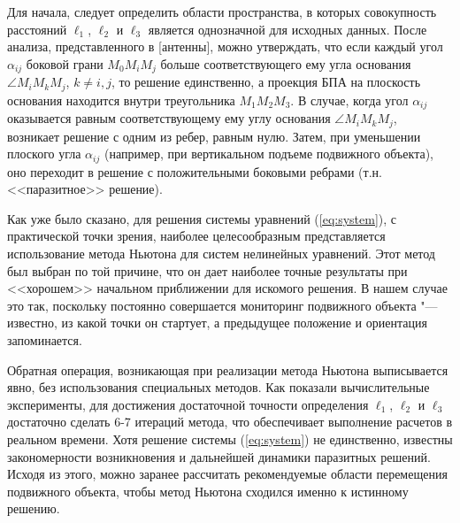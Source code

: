 \documentclass[a4paper,12pt]{article}
\begin{document}

Для начала, следует определить области пространства, в которых совокупность расстояний $\ell_1$,
$\ell_2$ и $\ell_3$ является однозначной для исходных данных. После анализа, представленного в [антенны],
можно утверждать, что если каждый угол $\alpha_{ij}$ боковой грани $M_0 M_i M_j$ больше соответствующего
ему угла основания $\angle M_i M_k M_j$, $k \ne i,j$, то решение единственно, а проекция БПА на плоскость основания
находится внутри треугольника $M_1 M_2 M_3$. В случае, когда угол $\alpha_{ij}$ оказывается равным
соответствующему ему углу основания $\angle M_i M_k M_j$, возникает решение с одним из ребер, равным нулю. Затем, при
уменьшении плоского угла $\alpha_{ij}$ (например, при вертикальном подъеме подвижного объекта), оно переходит в
решение с положительными боковыми ребрами (т.н. <<паразитное>> решение).

Как уже было сказано, для решения системы уравнений (\ref{eq:system}), с практической точки зрения, наиболее
целесообразным представляется использование метода Ньютона для систем нелинейных уравнений. Этот метод был выбран
по той причине, что он дает наиболее точные результаты при <<хорошем>> начальном приближении
для искомого решения. В нашем случае это так, поскольку постоянно совершается мониторинг подвижного объекта
"--- известно, из какой точки он стартует, а предыдущее положение и ориентация запоминается.

Обратная операция, возникающая при реализации метода Ньютона выписывается явно, без использования
специальных методов. Как показали вычислительные эксперименты, для достижения достаточной точности
определения $\ell_1$, $\ell_2$ и $\ell_3$ достаточно сделать 6-7 итераций метода, что обеспечивает
выполнение расчетов в реальном времени. Хотя решение системы (\ref{eq:system}) не единственно, известны
закономерности возникновения и дальнейшей динамики паразитных решений. Исходя из этого, можно заранее
рассчитать рекомендуемые области перемещения подвижного объекта, чтобы метод Ньютона сходился именно
к истинному решению.
\end{document}
